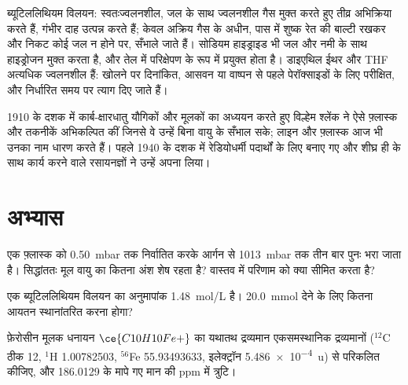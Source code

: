 \begin{safety}{}
ब्यूटिललिथियम विलयन: स्वतःज्वलनशील, जल के साथ ज्वलनशील गैस मुक्त करते हुए तीव्र अभिक्रिया करते हैं,
गंभीर दाह उत्पन्न करते हैं; केवल अक्रिय गैस के अधीन, पास में शुष्क
रेत की बाल्टी रखकर और निकट कोई जल न होने पर, सँभाले जाते हैं। सोडियम हाइड्राइड भी जल और नमी के साथ
हाइड्रोजन मुक्त करता है, और तेल में परिक्षेपण के रूप में प्रयुक्त होता है। डाइएथिल
ईथर और THF अत्यधिक ज्वलनशील  हैं: खोलने पर दिनांकित, आसवन या वाष्पन से पहले
पेरॉक्साइडों के लिए परीक्षित, और निर्धारित समय पर त्याग दिए जाते हैं।
\end{safety}

\begin{history}[श्लेंक के काँच के उपकरण]
1910 के दशक में कार्ब-क्षारधातु यौगिकों और मूलकों का अध्ययन करते हुए विल्हेम श्लेंक ने
ऐसे फ़्लास्क और तकनीकें अभिकल्पित कीं जिनसे वे उन्हें बिना वायु के सँभाल सके; लाइन और
फ़्लास्क आज भी उनका नाम धारण करते हैं। पहले 
1940 के दशक में रेडियोधर्मी पदार्थों के लिए बनाए गए और शीघ्र ही  के साथ कार्य करने वाले
रसायनज्ञों ने उन्हें अपना लिया।
\end{history}

\section{अभ्यास}

\begin{exercise}[$\star$]\label{exo:b3:lab-techniques-3:1}
एक फ़्लास्क को \qty{0.50}{mbar} तक निर्वातित करके आर्गन से \qty{1013}{mbar} तक तीन बार पुनः भरा जाता है। सिद्धांततः
मूल वायु का कितना अंश शेष रहता है? वास्तव में परिणाम को क्या सीमित करता है?
\end{exercise}

\begin{exercise}[$\star$]\label{exo:b3:lab-techniques-3:2}
एक ब्यूटिललिथियम विलयन का अनुमापांक \qty{1.48}{mol/L} है। \qty{20.0}{mmol} देने के लिए कितना आयतन
स्थानांतरित करना होगा?
\end{exercise}

\begin{exercise}[$\star$]\label{exo:b3:lab-techniques-3:3}
फ़ेरोसीन मूलक धनायन $\ce{C10H10Fe+}$ का यथातथ द्रव्यमान एकसमस्थानिक द्रव्यमानों
($^{12}$C ठीक 12, $^1$H 1.00782503, $^{56}$Fe 55.93493633, इलेक्ट्रॉन \qty{5.486e-4}{u}) से परिकलित कीजिए, और
186.0129 के मापे गए मान की ppm में त्रुटि।
\end{exercise}

